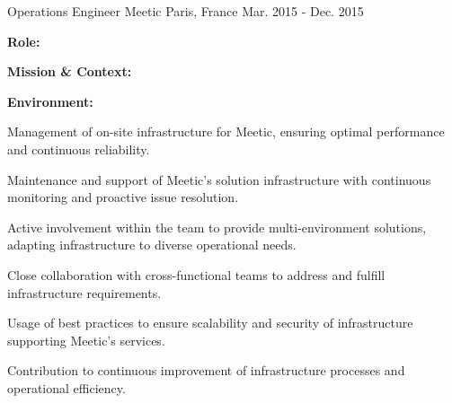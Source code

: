 \begin{cventries}
\cventry
{Operations Engineer} %
{Meetic} %
{Paris, France} %
{Mar. 2015 - Dec. 2015} %
{
  \begin{cvitems} %
    \item {\textbf{Role:} }
    \item {\textbf{Mission \& Context:} }
    \item {\textbf{Environment:} }
    \item {Management of on-site infrastructure for Meetic, ensuring optimal performance and continuous reliability.}
    \item {Maintenance and support of Meetic's solution infrastructure with continuous monitoring and proactive issue resolution.}
    \item {Active involvement within the team to provide multi-environment solutions, adapting infrastructure to diverse operational needs.}
    \item {Close collaboration with cross-functional teams to address and fulfill infrastructure requirements.}
    \item {Usage of best practices to ensure scalability and security of infrastructure supporting Meetic's services.}
    \item {Contribution to continuous improvement of infrastructure processes and operational efficiency.}
  \end{cvitems}
}
\end{cventries}
